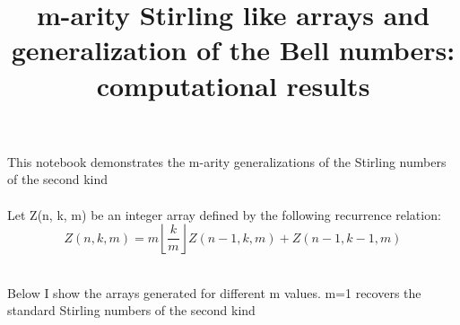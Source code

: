 \documentclass{article}
\begin{document}
\title{m-arity Stirling like arrays and generalization of the Bell numbers: computational results}
\author{}
\date{}
\maketitle

This notebook demonstrates the m-arity generalizations of the Stirling numbers of the second kind\\
\\
Let Z(n, k, m) be an integer array defined by the following recurrence relation:\\


\[Z(n,k,m)=m \left\lfloor \frac{k}{m}\right\rfloor  Z(n-1,k,m)+Z(n-1,k-1,m)\]

\\
Below I show the arrays generated for different m values. m=1 recovers the standard Stirling numbers of the second kind\\
\end{document}
